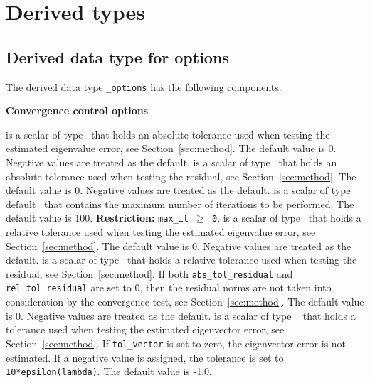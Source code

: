 \section{Derived types}

\subsection{Derived data type for options}

\label{sec:options}

The derived data type
{\tt \solver\_options}
has the following components.

\bigskip
\noindent
{\bf Convergence control options}

\begin{description}
%
 is a scalar of type %
\REALDP\ that
holds an absolute tolerance used when testing the estimated eigenvalue 
error, see Section~\ref{sec:method}. 
The default value is 0. %
Negative values are treated as the default.
%
 is a scalar of type %
\REALDP\ that
holds an absolute tolerance used when testing the residual, 
see Section~\ref{sec:method}.
The default value is 0.
Negative values are treated as the default.
%
 is a scalar of type default \Integer\ that
contains the maximum number of iterations to be performed.
The default value is 100. %
{\bf Restriction:} {\tt max\_it $\ge$ 0}.
%
 is a scalar of type %
\REALDP\ that
holds a relative tolerance used when testing the estimated eigenvalue 
error, see Section~\ref{sec:method}. 
The default value is 0. %
Negative values are treated as the default.
%
 is a scalar of type %
\REALDP\ that
holds a relative tolerance used when testing the residual,
see Section~\ref{sec:method}. 
If both {\tt abs\_tol\_residual} and {\tt rel\_tol\_residual}
are set to 0, then the residual norms are not taken
into consideration by the convergence test,
see Section~\ref{sec:method}.
The default value is 0.
Negative values are treated as the default.
%
 is a scalar of type \REALDP\ %
that holds a tolerance used when testing the estimated 
eigenvector error, see Section~\ref{sec:method}. 
If {\tt tol\_vector} is set to zero, the eigenvector error is not estimated.
If a negative value is assigned, the tolerance is set to
{\tt 10*epsilon(lambda)}.
The default value is -1.0.
%
\end{description}

